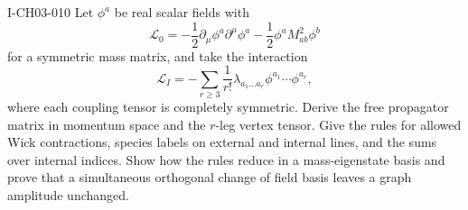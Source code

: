 \begin{exercise}{I-CH03-010}
Let $\phi^a$ be real scalar fields with
\[
 \mathcal L_0=-\frac12\partial_\mu\phi^a\partial^\mu\phi^a
 -\frac12\phi^aM^2_{ab}\phi^b
\]
for a symmetric mass matrix, and take the interaction
\[
 \mathcal L_I=-\sum_{r\geq3}\frac{1}{r!}
 \lambda_{a_1\ldots a_r}\phi^{a_1}\cdots\phi^{a_r},
\]
where each coupling tensor is completely symmetric.  Derive the free
propagator matrix in momentum space and the $r$-leg vertex tensor.  Give the
rules for allowed Wick contractions, species labels on external and internal
lines, and the sums over internal indices.  Show how the rules reduce in a
mass-eigenstate basis and prove that a simultaneous orthogonal change of field
basis leaves a graph amplitude unchanged.
\end{exercise}
